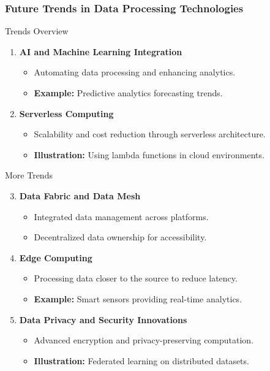 \documentclass{beamer}
\begin{document}
\begin{frame}[fragile]
    \frametitle{Future Trends in Data Processing Technologies}
    \begin{block}{Trends Overview}
        \begin{enumerate}
            \item {\bf AI and Machine Learning Integration}
                \begin{itemize}
                    \item Automating data processing and enhancing analytics.
                    \item \textbf{Example:} Predictive analytics forecasting trends.
                \end{itemize}
            \item {\bf Serverless Computing}
                \begin{itemize}
                    \item Scalability and cost reduction through serverless architecture.
                    \item \textbf{Illustration:} Using lambda functions in cloud environments.
                \end{itemize}
        \end{enumerate}
    \end{block}
    
    \begin{block}{More Trends}
        \begin{enumerate}
            \setcounter{enumi}{2} %
            \item {\bf Data Fabric and Data Mesh}
                \begin{itemize}
                    \item Integrated data management across platforms.
                    \item Decentralized data ownership for accessibility.
                \end{itemize}
            \item {\bf Edge Computing}
                \begin{itemize}
                    \item Processing data closer to the source to reduce latency.
                    \item \textbf{Example:} Smart sensors providing real-time analytics.
                \end{itemize}
            \item {\bf Data Privacy and Security Innovations}
                \begin{itemize}
                    \item Advanced encryption and privacy-preserving computation.
                    \item \textbf{Illustration:} Federated learning on distributed datasets.
                \end{itemize}
        \end{enumerate}
    \end{block}
\end{frame}
\end{document}

